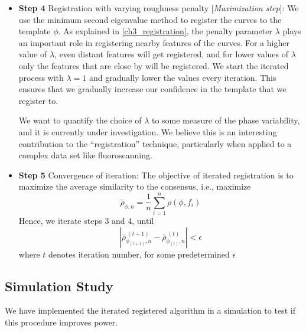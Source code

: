 \begin{itemize}
\item {\bf{Step 4}} Registration with varying roughness penalty [{\emph{Maximization step}}]: We use the minimum second eigenvalue method to register the curves to the template $\phi$. As explained in \ref{ch3_registration}, the penalty parameter $\lambda$ plays an important role in registering nearby features of the curves. For a higher value of $\lambda$, even distant features will get registered, and for lower values of $\lambda$ only the features that are close by will be registered. We start the iterated process with $\lambda = 1$ and gradually lower the values every iteration. This ensures that we gradually increase our confidence in the template that we register to. 
\begin{tcolorbox}[colback=green!5,colframe=green!40!black,title=Work in progress] %
We want to quantify the choice of $\lambda$ to some measure of the phase variability, and it is currently under investigation. We believe this is an interesting contribution to the ``registration'' technique, particularly when applied to a complex data set like fluoroscanning.
\end{tcolorbox}
\item {\bf{Step 5}} Convergence of iteration: The objective of iterated registration is to maximize the average similarity to the consensus, i.e., maximize 
\[ \bar{\rho}_{\phi, n} = \frac{1}{n} \sum \limits_{i = 1}^{n} \rho(\phi, f_i)\]
Hence, we iterate steps 3 and 4, until
\[ |\bar{\rho}_{\phi_{(t+1)}, n}^{\ (t+1)} - \bar{\rho}_{\phi_{(t)}, n}^{ \ (t)} | < \epsilon \]
where $t$ denotes iteration number, for some predetermined $\epsilon$
\end{itemize}

\subsection{Simulation Study}
We have implemented the iterated registered algorithm in a simulation to test if this procedure improves power. 
